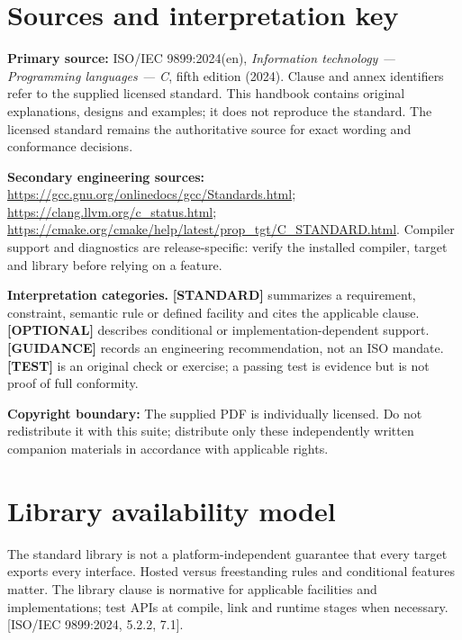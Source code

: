 \documentclass[10pt,letterpaper,oneside]{report}
\newcommand{\refcl}[1]{\textsf{\footnotesize[ISO/IEC 9899:2024, #1]}}
\begin{document}
\chapter*{Sources and interpretation key}
\textbf{Primary source:} ISO/IEC 9899:2024(en), \emph{Information technology --- Programming languages --- C}, fifth edition (2024). Clause and annex identifiers refer to the supplied licensed standard. This handbook contains original explanations, designs and examples; it does not reproduce the standard. The licensed standard remains the authoritative source for exact wording and conformance decisions.\par
\textbf{Secondary engineering sources:} \url{https://gcc.gnu.org/onlinedocs/gcc/Standards.html}; \url{https://clang.llvm.org/c_status.html}; \url{https://cmake.org/cmake/help/latest/prop_tgt/C_STANDARD.html}. Compiler support and diagnostics are release-specific: verify the installed compiler, target and library before relying on a feature.\par
\begin{keybox}\textbf{Interpretation categories.} \textbf{[STANDARD]} summarizes a requirement, constraint, semantic rule or defined facility and cites the applicable clause. \textbf{[OPTIONAL]} describes conditional or implementation-dependent support. \textbf{[GUIDANCE]} records an engineering recommendation, not an ISO mandate. \textbf{[TEST]} is an original check or exercise; a passing test is evidence but is not proof of full conformity.\end{keybox}
\textbf{Copyright boundary:} The supplied PDF is individually licensed. Do not redistribute it with this suite; distribute only these independently written companion materials in accordance with applicable rights.\par


\chapter{Library availability model}
The standard library is not a platform-independent guarantee that every target exports every interface. Hosted versus freestanding rules and conditional features matter. The library clause is normative for applicable facilities and implementations; test APIs at compile, link and runtime stages when necessary. \refcl{5.2.2, 7.1}.
\end{document}
